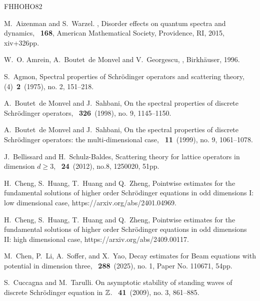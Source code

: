 \documentclass[reqno, 11pt]{amsart}
\numberwithin{equation}{section}
\begin{document}
\begin{thebibliography}{FHHOHO82}

M.~Aizenman and S.~Warzel.
,
\newblock Disorder effects on quantum spectra and dynamics,
~{\bf168},
 \newblock American Mathematical Society, Providence, RI, 2015, xiv+326pp.

W.~O. Amrein, A.~Boutet~de Monvel and V.~Georgescu,
,
\newblock Birkh\"auser, 1996.

S.~Agmon,
\newblock Spectral properties of {S}chr\"{o}dinger operators and scattering
  theory,
 (4)~{\bf2}~(1975), no. 2, 151--218.

A.~Boutet~de Monvel and J.~Sahbani,
\newblock On the spectral properties of discrete {S}chr\"odinger operators,
~{\bf326}~(1998), no. 9, 1145--1150.

A.~Boutet~de Monvel and J.~Sahbani,
\newblock On the spectral properties of discrete {S}chr\"odinger operators: the
  multi-dimensional case,
~{\bf11}~(1999), no. 9, 1061--1078.

J.~Bellissard and H.~Schulz-Baldes,
\newblock Scattering theory for lattice operators in dimension {$d\geq 3$},
~{\bf24}~(2012), no.8, 1250020, 51pp.

H.~Cheng, S.~Huang, T.~Huang and Q.~Zheng,
\newblock Pointwise estimates for the fundamental solutions of higher order Schr\"{o}dinger equations in odd dimensions I: low dimensional case,
\newblock https://arxiv.org/abs/2401.04969.

H.~Cheng, S.~Huang, T.~Huang and Q.~Zheng,
\newblock Pointwise estimates for the fundamental solutions of higher order Schr\"{o}dinger equations in odd dimensions II: high dimensional case,
\newblock  https://arxiv.org/abs/2409.00117.

M.~Chen, P.~Li, A.~Soffer, and X.~Yao,
\newblock Decay estimates for {B}eam equations with potential in dimension
  three,
~{\bf288}~(2025), no. 1, Paper No. 110671, 54pp.

S.~Cuccagna and M.~Tarulli.
\newblock On asymptotic stability of standing waves of discrete {S}chr\"odinger
  equation in {$\Bbb Z$}.
~{\bf41}~(2009), no. 3, 861--885.


\end{thebibliography}
\end{document}
